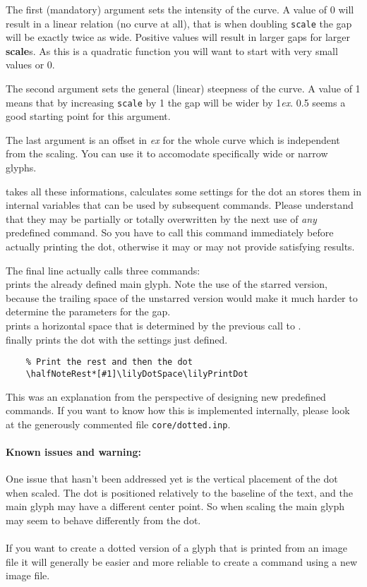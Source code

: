 \documentclass{OLLbook}
\begin{document}
The first (mandatory) argument sets the intensity of the curve.
A value of 0 will result in a linear relation (no curve at all), that is when doubling \texttt{scale} the gap will be exactly twice as wide.
Positive values will result in larger gaps for larger \textbf{scale}s.
As this is a quadratic function you will want to start with very small values or 0.

The second argument sets the general (linear) steepness of the curve.
A value of 1 means that by increasing \texttt{scale} by 1 the gap will be wider by 1\emph{ex}.
0.5 seems a good starting point for this argument.

The last argument is an offset in \emph{ex} for the whole curve which is independent from the scaling.
You can use it to accomodate specifically wide or narrow glyphs.

 takes all these informations, calculates some settings for the dot an stores them in internal variables that can be used by subsequent commands.
Please understand that they may be partially or totally overwritten by the next use of \emph{any} predefined command.
So you have to call this command immediately before actually printing the dot, otherwise it may or may not provide satisfying results.

The final line actually calls three commands:\\
 prints the already defined main glyph.
Note the use of the starred version, because the trailing space of the unstarred version would make it much harder to determine the parameters for the gap.\\
 prints a horizontal space that is determined by the previous call to .\\
 finally prints the dot with the settings just defined.

\begin{verbatim}
    % Print the rest and then the dot
    \halfNoteRest*[#1]\lilyDotSpace\lilyPrintDot
\end{verbatim}

This was an explanation from the perspective of designing new predefined commands.
If you want to know how this is implemented internally, please look at the generously commented file \texttt{core/dotted.inp}.

\paragraph*{Known issues and warning:} 
One issue that hasn't been addressed yet is the vertical placement of the dot when scaled.
The dot is positioned relatively to the baseline of the text, and the main glyph may have a different center point. 
So when scaling the main glyph may seem to behave differently from the dot.\\~\\
If you want to create a dotted version of a glyph that is printed from an image file it will generally be easier and more reliable to create a command using a new image file.
\end{document}
